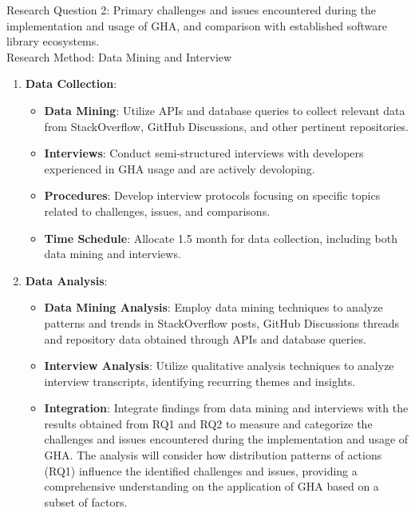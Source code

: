 \documentclass[conference]{IEEEtran}
\begin{document}
Research Question 2: Primary challenges and issues encountered during the implementation and usage of GHA, and comparison with established software library ecosystems.\\

Research Method: Data Mining and Interview\\

\begin{enumerate}
    \item \textbf{Data Collection}:\\
    \begin{itemize}
        \item \textbf{Data Mining}: Utilize APIs and database queries to collect relevant data from StackOverflow, GitHub Discussions, and other pertinent repositories.
        \item \textbf{Interviews}: Conduct semi-structured interviews with developers experienced in GHA usage and are actively devoloping.
        \item \textbf{Procedures}: Develop interview protocols focusing on specific topics related to challenges, issues, and comparisons.
        \item \textbf{Time Schedule}: Allocate 1.5 month for data collection, including both data mining and interviews.\\
    \end{itemize}
    
    \item \textbf{Data Analysis}:\\
    \begin{itemize}
        \item \textbf{Data Mining Analysis}: Employ data mining techniques to analyze patterns and trends in StackOverflow posts, GitHub Discussions threads and repository data obtained through APIs and database queries.
        \item \textbf{Interview Analysis}: Utilize qualitative analysis techniques to analyze interview transcripts, identifying recurring themes and insights.
        \item \textbf{Integration}: Integrate findings from data mining and interviews with the results obtained from RQ1 and RQ2 to measure and categorize the challenges and issues encountered during the implementation and usage of GHA. The analysis will consider how distribution patterns of actions (RQ1) influence the identified challenges and issues, providing a comprehensive understanding on the application of GHA based on a subset of factors.\\
    \end{itemize}
\end{enumerate}
\end{document}
